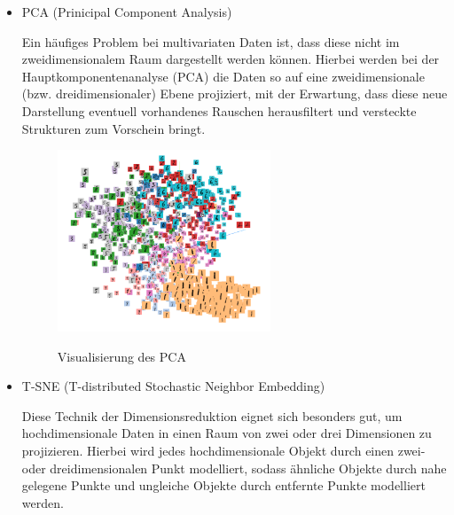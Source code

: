 \begin{itemize} 
\item PCA (Prinicipal Component Analysis) \vspace{10pt}

Ein häufiges Problem bei multivariaten Daten ist, dass diese nicht im zweidimensionalem Raum dargestellt werden können.  Hierbei werden bei der Hauptkomponentenanalyse (PCA) die Daten so auf eine zweidimensionale (bzw. dreidimensionaler) Ebene projiziert, mit der Erwartung, dass diese neue Darstellung eventuell vorhandenes Rauschen herausfiltert und versteckte Strukturen zum Vorschein bringt. \cite{pca}
\begin{figure}[h!]
	\centering
	 \includegraphics[width=0.6\textwidth]{images/Kapitel_3/projektor_pca.png}\\
	\vspace{10pt} 
	\caption[Visualisierung des PCA]{Visualisierung des PCA}
	\label{fig:pca}
\end{figure}



\item T-SNE (T-distributed Stochastic Neighbor Embedding) \vspace{10pt}

Diese Technik der Dimensionsreduktion eignet sich besonders gut, um hochdimensionale Daten in einen Raum von zwei oder drei Dimensionen zu projizieren. Hierbei wird jedes hochdimensionale Objekt durch einen zwei- oder dreidimensionalen Punkt modelliert, sodass ähnliche Objekte durch nahe gelegene Punkte und ungleiche Objekte durch entfernte Punkte modelliert werden. \cite{t-sne}



\end{itemize}
